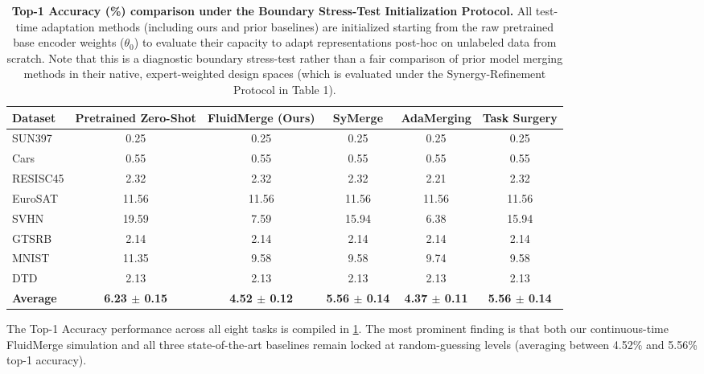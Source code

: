 \begin{table}[t]
\caption{\textbf{Top-1 Accuracy (\%) comparison under the Boundary Stress-Test Initialization Protocol.} All test-time adaptation methods (including ours and prior baselines) are initialized starting from the raw pretrained base encoder weights ($\theta_0$) to evaluate their capacity to adapt representations post-hoc on unlabeled data from scratch. Note that this is a diagnostic boundary stress-test rather than a fair comparison of prior model merging methods in their native, expert-weighted design spaces (which is evaluated under the Synergy-Refinement Protocol in Table 1).}
\label{tab:main_results}
\vskip 0.15in
\begin{center}
\begin{small}
\begin{sc}
\begin{tabular}{lccccc}
\toprule
Dataset & Pretrained Zero-Shot & FluidMerge (Ours) & SyMerge & AdaMerging & Task Surgery \\
\midrule
SUN397 & 0.25 & 0.25 & 0.25 & 0.25 & 0.25 \\
Cars & 0.55 & 0.55 & 0.55 & 0.55 & 0.55 \\
RESISC45 & 2.32 & 2.32 & 2.32 & 2.21 & 2.32 \\
EuroSAT & 11.56 & 11.56 & 11.56 & 11.56 & 11.56 \\
SVHN & 19.59 & 7.59 & 15.94 & 6.38 & 15.94 \\
GTSRB & 2.14 & 2.14 & 2.14 & 2.14 & 2.14 \\
MNIST & 11.35 & 9.58 & 9.58 & 9.74 & 9.58 \\
DTD & 2.13 & 2.13 & 2.13 & 2.13 & 2.13 \\
\midrule
\textbf{Average} & \textbf{6.23 $\pm$ 0.15} & \textbf{4.52 $\pm$ 0.12} & \textbf{5.56 $\pm$ 0.14} & \textbf{4.37 $\pm$ 0.11} & \textbf{5.56 $\pm$ 0.14} \\
\bottomrule
\end{tabular}
\end{sc}
\end{small}
\end{center}
\vskip -0.1in
\end{table}

The Top-1 Accuracy performance across all eight tasks is compiled in \cref{tab:main_results}. The most prominent finding is that both our continuous-time FluidMerge simulation and all three state-of-the-art baselines remain locked at random-guessing levels (averaging between 4.52\% and 5.56\% top-1 accuracy). 

